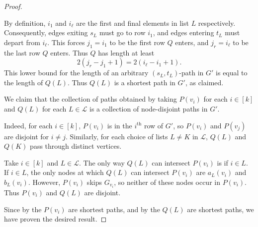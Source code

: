 \documentclass[11pt]{article}
\newcommand{\ca}{\mathcal}
\theoremstyle{definition}
\begin{document}
\begin{proof}
\begin{claimproof}
            By definition, $i_1$ and $i_\ell$ are the first and final elements in list $L$ respectively.
            Consequently, edges exiting $s_L$ must go to row $i_1$, and edges entering $t_L$ must depart from $i_\ell$.
            This forces $j_1 = i_1$ to be the first row $Q$ enters, and $j_r = i_\ell$ to be the last row $Q$ enters.
            Thus $Q$ has length at least 
                \[2(j_r-j_1+1) = 2(i_\ell - i_1 + 1).\]
            This lower bound for the length of an arbitrary $(s_L,t_L)$-path in $G'$ is equal to the length of $Q(L)$.
            Thus $Q(L)$ is a shortest path in $G'$, as claimed.
        \end{claimproof}

        We claim that the collection of paths obtained by taking $P(v_i)$ for each $i\in [k]$ and $Q(L)$ for each $L\in\ca{L}$ is a collection of node-disjoint paths in $G'$.

        Indeed, for each $i\in [k]$, $P(v_i)$ is in the $i^{\text{th}}$ row of $G'$, so $P(v_i)$ and $P(v_j)$ are disjoint for $i\neq j$.
        Similarly, for each choice of lists $L\neq K$ in $\ca{L}$, $Q(L)$ and $Q(K)$ pass through distinct vertices.

        Take $i\in [k]$ and $L\in \ca{L}$.
        The only way $Q(L)$ can intersect $P(v_i)$ is if $i\in L$.
        If $i\in L$, the only nodes at which $Q(L)$ can intersect $P(v_i)$ are $a_L(v_i)$ and $b_L(v_i)$.
        However, $P(v_i)$ skips $G_{v_i}$, so neither of these nodes occur in $P(v_i)$.
        Thus $P(v_i)$ and $Q(L)$ are disjoint.

        Since by  the $P(v_i)$ are shortest paths, and by  the $Q(L)$ are shortest paths, we have proven the desired result. 
    \end{proof}
\end{document}
